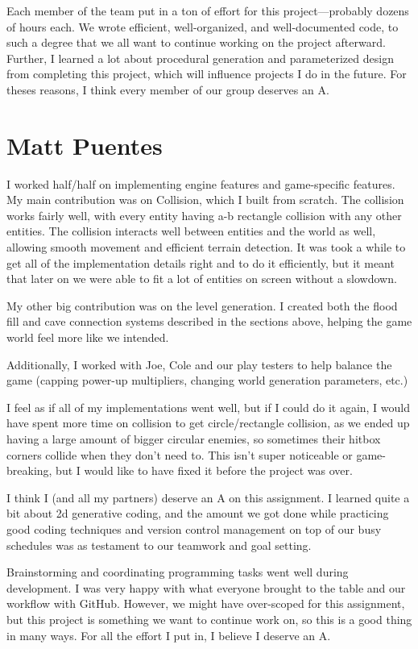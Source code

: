 \documentclass[a4paper, 12pt]{article}
\begin{document}
Each member of the team put in a ton of effort for this project---probably
dozens of hours each. We wrote efficient, well-organized, and well-documented
code, to such a degree that we all want to continue working on the project
afterward. Further, I learned a lot about procedural generation and
parameterized design from completing this project, which will influence projects
I do in the future. For theses reasons, I think every member of our group
deserves an A.

\section{Matt Puentes}

I worked half/half on implementing engine features and game-specific features.
My main contribution was on Collision, which I built from scratch. The collision
works fairly well, with every entity having a-b rectangle collision with any
other entities. The collision interacts well between entities and the world as
well, allowing smooth movement and efficient terrain detection. It was took a
while to get all of the implementation details right and to do it efficiently, 
but it meant that later on we were able to fit a lot of entities on screen
without a slowdown.

My other big contribution was on the level generation. I created both the
flood fill and cave connection systems described in the sections above, helping
the game world feel more like we intended.

Additionally, I worked with Joe, Cole and our play testers to help balance the
game (capping power-up multipliers, changing world generation parameters, etc.)

I feel as if all of my implementations went well, but if I could do it again, I
would have spent more time on collision to get circle/rectangle collision, as we
ended up having a large amount of bigger circular enemies, so sometimes their
hitbox corners collide when they don't need to. This isn't super noticeable or
game-breaking, but I would like to have fixed it before the project was over.

I think I (and all my partners) deserve an A on this assignment. I learned quite
a bit about 2d generative coding, and the amount we got done while practicing
good coding techniques and version control management on top of our busy
schedules was as testament to our teamwork and goal setting.

Brainstorming and coordinating programming tasks went well during development. I
was very happy with what everyone brought to the table and our workflow with
GitHub. However, we might have over-scoped for this assignment, but this project
is something we want to continue work on, so this is a good thing in many ways.
For all the effort I put in, I believe I deserve an A.
\end{document}
